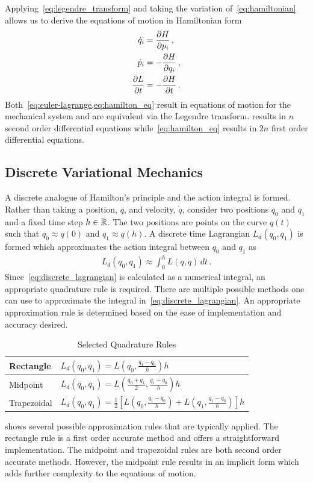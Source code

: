 \documentclass[preprint]{elsarticle}
\begin{document}
Applying~\cref{eq:legendre_transform} and taking the variation of~\cref{eq:hamiltonian} allows us to derive the equations of motion in Hamiltonian form
\begin{subequations}\label{eq:hamilton_eq}
\begin{align}
	\dot{q}_i &= \frac{\partial H}{\partial p_i} \, ,\\
	\dot{p}_i &= - \frac{\partial H}{\partial q_i} \, , \\
	\frac{\partial L}{\partial t} &= -\frac{\partial H}{\partial t} \, .
\end{align}
\end{subequations}
Both~\cref{eq:euler-lagrange,eq:hamilton_eq} result in equations of motion for the mechanical system and are equivalent via the Legendre transform.
 results in \( n \) second order differential equations while~\cref{eq:hamilton_eq} results in \( 2n \) first order differential equations.
\subsection{Discrete Variational Mechanics}
A discrete analogue of Hamilton's principle and the action integral is formed.
Rather than taking a position, \( q \), and velocity, \( \dot{q} \), consider two positions \( q_0 \) and \( q_1 \) and a fixed time step \( h \in \mathbb{R} \).
The two positions are points on the curve \( q(t) \) such that \( q_0 \approx q(0) \) and \( q_1 \approx q(h) \).
A discrete time Lagrangian \( L_d( q_0, q_1) \) is formed which approximates the action integral between \( q_0 \) and \( q_1 \) as 
\begin{align}\label{eq:discrete_lagrangian}
	L_d\left( q_0 , q_1 \right) \approx \int_{0}^{h} L \left( q , \dot{q} \right) \, dt \, .
\end{align}
Since~\cref{eq:discrete_lagrangian} is calculated as a numerical integral, an appropriate quadrature rule is required.
There are multiple possible methods one can use to approximate the integral in~\cref{eq:discrete_lagrangian}.
An appropriate approximation rule is determined based on the ease of implementation and accuracy desired.
\begin{table}[htbp]
\caption{Selected Quadrature Rules\label{tab:quadrature}}
\begin{center}
\begin{tabular}{l|l}Rectangle & \( L_d(q_0,q_1) =L(q_0,\frac{q_1-q_0}{h}) h \)  \\ \hline
Midpoint & \( L_d(q_0,q_1) = L(\frac{q_0 + q_1}{2},\frac{q_1 - q_0}{h}) h \) \\ \hline
Trapezoidal & \( L_d(q_0, q_1) = \frac{1}{2} \left[ L(q_0, \frac{q_1 - q_0}{h} ) + L(q_1, \frac{q_1 - q_0 }{h} )\right] h \)
\end{tabular} 
\end{center}
\end{table}
 shows several possible approximation rules that are typically applied.
The rectangle rule is a first order accurate method and offers a straightforward implementation.
The midpoint and trapezoidal rules are both second order accurate methods. 
However, the midpoint rule results in an implicit form which adds further complexity to the equations of motion.
\end{document}
